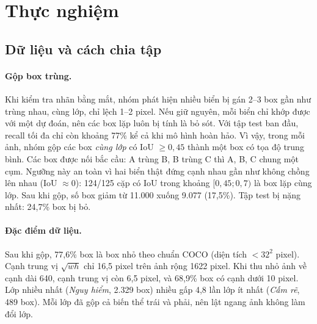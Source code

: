 
\section{Thực nghiệm}
\label{sec:experiments}

\subsection{Dữ liệu và cách chia tập}
\label{sec:data-split}

\paragraph{Gộp box trùng.}
Khi kiểm tra nhãn bằng mắt, nhóm phát hiện nhiều biển bị gán 2--3 box gần như trùng nhau, cùng lớp, chỉ lệch 1--2 pixel. Nếu giữ nguyên, mỗi biển chỉ khớp được với một dự đoán, nên các box lặp luôn bị tính là bỏ sót. Với tập test ban đầu, recall tối đa chỉ còn khoảng 77\% kể cả khi mô hình hoàn hảo.
Vì vậy, trong mỗi ảnh, nhóm gộp các box \emph{cùng lớp} có IoU $\geq 0{,}45$ thành một box có tọa độ trung bình. Các box được nối bắc cầu: A trùng B, B trùng C thì A, B, C chung một cụm.
Ngưỡng này an toàn vì hai biển thật đứng cạnh nhau gần như không chồng lên nhau (IoU $\approx 0$): 124/125 cặp có IoU trong khoảng $[0{,}45; 0{,}7)$ là box lặp cùng lớp.
Sau khi gộp, số box giảm từ 11.000 xuống 9.077 (17,5\%). Tập test bị nặng nhất: 24,7\% box bị bỏ.

\paragraph{Đặc điểm dữ liệu.}
Sau khi gộp, 77,6\% box là box nhỏ theo chuẩn COCO (diện tích $< 32^2$ pixel). Cạnh trung vị $\sqrt{wh}$ chỉ 16,5 pixel trên ảnh rộng 1622 pixel.
Khi thu nhỏ ảnh về cạnh dài 640, cạnh trung vị còn 6,5 pixel, và 68,9\% box có cạnh dưới 10 pixel.
Lớp nhiều nhất (\textit{Nguy hiểm}, 2.329 box) nhiều gấp 4,8 lần lớp ít nhất (\textit{Cấm rẽ}, 489 box).
Mỗi lớp đã gộp cả biến thể trái và phải, nên lật ngang ảnh không làm đổi lớp.

